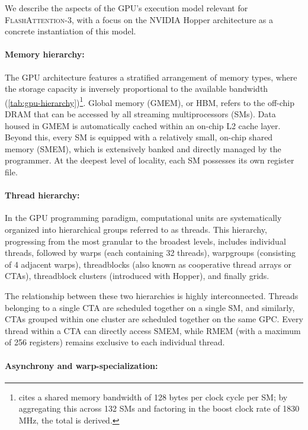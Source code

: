 We describe the aspects of the GPU's execution model relevant for \textsc{FlashAttention-3}, with a focus on the NVIDIA Hopper architecture as a concrete instantiation of this model.

\paragraph{Memory hierarchy:} The GPU architecture features a stratified arrangement of memory types, where the storage capacity is inversely proportional to the available bandwidth (\cref{tab:gpu-hierarchy})\footnote{\citet{luo2024benchmarking} cites a shared memory bandwidth of 128 bytes per clock cycle per SM; by aggregating this across 132 SMs and factoring in the boost clock rate of 1830 MHz, the total is derived.}. Global memory (GMEM), or HBM, refers to the off-chip DRAM that can be accessed by all streaming multiprocessors (SMs). Data housed in GMEM is automatically cached within an on-chip L2 cache layer. Beyond this, every SM is equipped with a relatively small, on-chip shared memory (SMEM), which is extensively banked and directly managed by the programmer. At the deepest level of locality, each SM possesses its own register file.

\paragraph{Thread hierarchy:} In the GPU programming paradigm, computational units are systematically organized into hierarchical groups referred to as threads. This hierarchy, progressing from the most granular to the broadest levels, includes individual threads, followed by warps (each containing 32 threads), warpgroups (consisting of 4 adjacent warps), threadblocks (also known as cooperative thread arrays or CTAs), threadblock clusters (introduced with Hopper), and finally grids.

The relationship between these two hierarchies is highly interconnected. Threads belonging to a single CTA are scheduled together on a single SM, and similarly, CTAs grouped within one cluster are scheduled together on the same GPC. Every thread within a CTA can directly access SMEM, while RMEM (with a maximum of 256 registers) remains exclusive to each individual thread.

\paragraph{Asynchrony and warp-specialization:}

